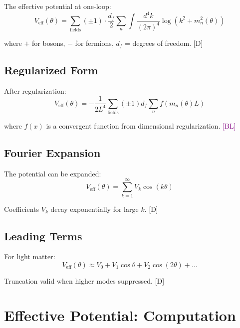 \documentclass[11pt,a4paper]{article}
\newcommand{\tagD}{\textcolor{blue!70!black}{[D]}}
\newcommand{\tagBL}{\textcolor{purple}{[BL]}}
\begin{document}
The effective potential at one-loop:
\begin{equation}
\label{eq:veff-oneloop}
V_{\text{eff}}(\theta) = \sum_{\text{fields}} (\pm 1) \cdot \frac{d_f}{2} \sum_n \int \frac{d^4k}{(2\pi)^4} \log(k^2 + m_n^2(\theta))
\end{equation}

where $+$ for bosons, $-$ for fermions, $d_f$ = degrees of freedom. \tagD

\subsection{Regularized Form}

After regularization:
\begin{equation}
\label{eq:veff-reg}
V_{\text{eff}}(\theta) = -\frac{1}{2L^4} \sum_{\text{fields}} (\pm 1) d_f \sum_n f(m_n(\theta) L)
\end{equation}

where $f(x)$ is a convergent function from dimensional regularization. \tagBL

\subsection{Fourier Expansion}

The potential can be expanded:
\begin{equation}
\label{eq:veff-fourier}
V_{\text{eff}}(\theta) = \sum_{k=1}^{\infty} V_k \cos(k\theta)
\end{equation}

Coefficients $V_k$ decay exponentially for large $k$. \tagD

\subsection{Leading Terms}

For light matter:
\begin{equation}
\label{eq:veff-leading}
V_{\text{eff}}(\theta) \approx V_0 + V_1 \cos\theta + V_2 \cos(2\theta) + \ldots
\end{equation}

Truncation valid when higher modes suppressed. \tagD

\section{Effective Potential: Computation}
\end{document}
